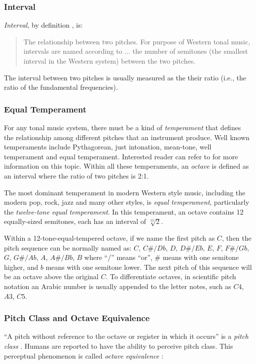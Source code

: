 \subsubsection{Interval}
{\it Interval}, by definition \cite{randel1999harvard}, is:
\begin{quote}
The relationship between two pitches. For purpose of Western tonal music, intervals are named according to ... the number of semitones (the smallest interval in the Western system) between the two pitches.
\end{quote}
The interval between two pitches is usually measured as the their ratio (i.e., the ratio of the fundamental frequencies).

\subsubsection{Equal Temperament}
For any tonal music system, there must be a kind of {\it temperament} that defines the relationship among different pitches that an instrument produce. Well known temperaments include Pythagorean, just intonation, mean-tone, well temperament and equal temperament. Interested reader can refer to \cite{barbour2004tuning} for more information on this topic. Within all these temperaments, an {\it octave} is defined as an interval where the ratio of two pitches is 2:1. %

The most dominant temperament in modern Western style music, including the modern pop, rock, jazz and many other styles, is {\it equal temperament}, particularly the {\it twelve-tone equal temperament}. In this temperament, an octave contains 12 equally-sized semitones, each has an interval of $\sqrt[12]{2} $.

Within a 12-tone-equal-tempered octave, if we name the first pitch as $C$, then the pitch sequence can be normally named as:
$C$, $C\#/Db$, $D$, $D\#/Eb$, $E$, $F$, $F\#/Gb$, $G$, $G\#/Ab$, $A$, $A\#/Bb$, $B$
where ``/'' means ``or'', $\#$ means with one semitone higher, and $b$ means with one semitone lower. The next pitch of this sequence will be an octave above the original $C$. To differentiate octaves, in scientific pitch notation \cite{tuningstandard} an Arabic number is usually appended to the letter notes, such as $C4$, $A3$, $C5$.

\subsubsection{Pitch Class and Octave Equivalence}
``A pitch without reference to the octave or register in which it occurs'' is a {\it pitch class} \cite{randel1999harvard}. Humans are reported to have the ability to perceive pitch class. This perceptual phenomenon is called {\it octave equivalence} \cite{randel1999harvard,boring1942sensation}:

